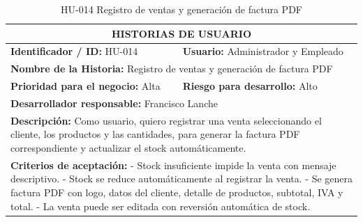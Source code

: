 \documentclass[12pt, letterpaper]{report}
\begin{document}
\begin{table}[H]
\centering
\caption{HU-014 Registro de ventas y generación de factura PDF}
\begin{tabularx}{\textwidth}{|X X|}
\hline
\multicolumn{2}{|c|}{\textbf{HISTORIAS DE USUARIO}} \\ \hline
\textbf{Identificador / ID:} HU-014 & \textbf{Usuario:} Administrador y Empleado \\ \hline
\multicolumn{2}{|l|}{\textbf{Nombre de la Historia:} Registro de ventas y generación de factura PDF} \\ \hline
\textbf{Prioridad para el negocio:} Alta & \textbf{Riesgo para desarrollo:} Alto \\ \hline
\multicolumn{2}{|l|}{\textbf{Desarrollador responsable:} Francisco Lanche} \\ \hline
\multicolumn{2}{|p{0.95\textwidth}|}{\textbf{Descripción:} Como usuario, quiero registrar una venta seleccionando el cliente, los productos y las cantidades, para generar la factura PDF correspondiente y actualizar el stock automáticamente.} \\ \hline
\multicolumn{2}{|p{0.95\textwidth}|}{\textbf{Criterios de aceptación:} \newline
- Stock insuficiente impide la venta con mensaje descriptivo. \newline
- Stock se reduce automáticamente al registrar la venta. \newline
- Se genera factura PDF con logo, datos del cliente, detalle de productos, subtotal, IVA y total. \newline
- La venta puede ser editada con reversión automática de stock.} \\ \hline
\end{tabularx}
\end{table}
\end{document}
